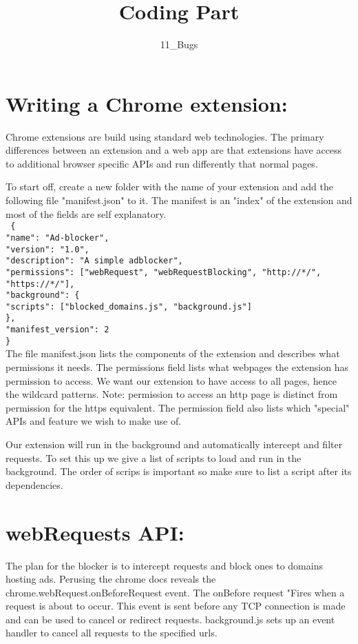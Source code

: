 \documentclass[12pt]{article}
\begin{document}
	\title{Coding Part}
	\author{11\_Bugs}
	\maketitle
	\part*{Writing a Chrome extension:}
	Chrome extensions are build using standard web technologies. The primary differences between an extension and a web app are that extensions have access to additional browser specific APIs and run differently that normal pages.
	
	To start off, create a new folder with the name of your extension and add the following file "manifest.json" to it. The manifest is an "index" of the extension and most of the fields are self explanatory.\\
	\texttt{ \{ \\
		"name": "Ad-blocker",\\
			"version": "1.0",\\
			"description": "A simple adblocker",\\
		"permissions": ["webRequest", "webRequestBlocking", "http://*/", "https://*/"],\\
		"background": \{ \\
		"scripts": ["blocked\_domains.js", "background.js"] \\
		\}, \\
		"manifest\_version": 2 \\
	\}
} \\
	The file manifest.json lists the components of the extension and describes what permissions it needs.
	The permissions field lists what webpages the extension has permission to access. We want our extension to have access to all pages, hence the wildcard patterns. Note: permission to access an http page is distinct from permission for the https equivalent. The permission field also lists which "special" APIs and feature we wish to make use of.
	
	Our extension will run in the background and automatically intercept and filter requests. To set this up we give a list of scripts to load and run in the background. The order of scrips is important so make sure to list a script after its dependencies.
	
	\part*{webRequests API:}
	The plan for the blocker is to intercept requests and block ones to domains hosting ads. Perusing the chrome docs reveals the chrome.webRequest.onBeforeRequest event. The onBefore request "Fires when a request is about to occur. This event is sent before any TCP connection is made and can be used to cancel or redirect requests.
	background.js sets up an event handler to cancel all requests to the specified urls.
	
\end{document}
